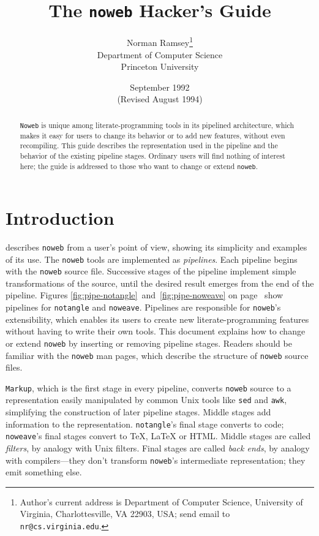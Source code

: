 \documentclass{article}
\title{The {\tt noweb} Hacker's Guide}
\author{Norman Ramsey\thanks{Author's current address is Department of
  Computer Science,
  University of Virginia, Charlottesville, VA 22903, USA;
send email to {\tt nr@cs.virginia.edu}.}\\Department of Computer Science\\
Princeton University}
\date{September 1992\\(Revised August 1994)}
\begin{document}
\maketitle

\begin{abstract}
{\tt Noweb} is unique among literate-programming tools in its
pipelined architecture, which makes it easy for users to change
its behavior or to add new features, without even recompiling.
This guide describes the representation used in the
pipeline and the behavior of the existing pipeline stages.
Ordinary users will find nothing of interest here; the guide is
addressed to those who want to change or extend {\tt noweb}.
\end{abstract}

\clearpage

\tableofcontents
\listoftables

\newpage

\section{Introduction}

 describes {\tt {\tt noweb}} from a user's
point of view, showing its simplicity and examples of its use.
The {\tt {\tt noweb}} tools are implemented as {\em pipelines}.
Each pipeline begins with the {\tt noweb}
source file.  Successive stages of the pipeline implement simple
transformations of the source, until the desired result emerges from
the end of the pipeline.  Figures
\ref{fig:pipe-notangle}~and~\ref{fig:pipe-noweave} on
page~\pageref{fig:pipe-notangle} show pipelines for
{\tt notangle} and {\tt noweave}.  
Pipelines are responsible for {\tt {\tt noweb}}'s
extensibility, which enables its users to create new literate-programming
features without having to write their own tools.
This document explains how to change or extend {\tt noweb} by
inserting or removing pipeline stages.
Readers should be familiar with the {\tt {\tt noweb}} man pages, which
describe the structure of {\tt {\tt noweb}} source files.

{\tt Markup}, which is the first stage in
every pipeline, converts {\tt noweb} source to a representation easily
manipulated by common Unix tools like {\tt sed} and {\tt awk}, simplifying
the construction of later pipeline stages.  Middle stages add
information to the representation.  {\tt notangle}'s final stage converts to
code; {\tt noweave}'s final stages convert to TeX, LaTeX or HTML.
Middle stages are called {\em filters}, by analogy with Unix filters.
Final stages are called {\em back ends}, by analogy with
compilers---they don't transform {\tt {\tt noweb}}'s intermediate
representation; they emit something else.
\end{document}
